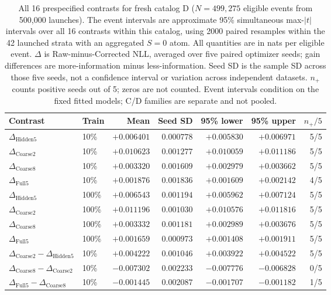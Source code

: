 \begin{table}[!htbp]
\centering
\small
\setlength{\tabcolsep}{3pt}
\caption{All 16 prespecified contrasts for fresh catalog D ($N=499,275$ eligible events from 500,000 launches). The event intervals are approximate 95\% simultaneous max-$|t|$ intervals over all 16 contrasts within this catalog, using 2000 paired resamples within the 42 launched strata with an aggregated $S=0$ atom. All quantities are in nats per eligible event. $\Delta$ is Raw-minus-Corrected NLL, averaged over five paired optimizer seeds; gain differences are more-information minus less-information. Seed SD is the sample SD across those five seeds, not a confidence interval or variation across independent datasets. $n_+$ counts positive seeds out of 5; zeros are not counted. Event intervals condition on the fixed fitted models; C/D families are separate and not pooled.}
\label{tab:information-D-primary16}
\begin{tabular}{llrrrrr}
\toprule
Contrast & Train & Mean & Seed SD & 95\% lower & 95\% upper & $n_+/5$ \\
\midrule
$\Delta_{\mathrm{Hidden5}}$ & 10\% & $+0.006401$ & $0.000778$ & $+0.005830$ & $+0.006971$ & 5/5 \\
$\Delta_{\mathrm{Coarse2}}$ & 10\% & $+0.010623$ & $0.001277$ & $+0.010059$ & $+0.011186$ & 5/5 \\
$\Delta_{\mathrm{Coarse8}}$ & 10\% & $+0.003320$ & $0.001609$ & $+0.002979$ & $+0.003662$ & 5/5 \\
$\Delta_{\mathrm{Full5}}$ & 10\% & $+0.001876$ & $0.001836$ & $+0.001609$ & $+0.002142$ & 4/5 \\
\midrule
$\Delta_{\mathrm{Hidden5}}$ & 100\% & $+0.006543$ & $0.001194$ & $+0.005962$ & $+0.007124$ & 5/5 \\
$\Delta_{\mathrm{Coarse2}}$ & 100\% & $+0.011196$ & $0.001030$ & $+0.010576$ & $+0.011816$ & 5/5 \\
$\Delta_{\mathrm{Coarse8}}$ & 100\% & $+0.003332$ & $0.001181$ & $+0.002989$ & $+0.003676$ & 5/5 \\
$\Delta_{\mathrm{Full5}}$ & 100\% & $+0.001659$ & $0.000973$ & $+0.001408$ & $+0.001911$ & 5/5 \\
\midrule
$\Delta_{\mathrm{Coarse2}}-\Delta_{\mathrm{Hidden5}}$ & 10\% & $+0.004222$ & $0.001046$ & $+0.003922$ & $+0.004522$ & 5/5 \\
$\Delta_{\mathrm{Coarse8}}-\Delta_{\mathrm{Coarse2}}$ & 10\% & $-0.007302$ & $0.002233$ & $-0.007776$ & $-0.006828$ & 0/5 \\
$\Delta_{\mathrm{Full5}}-\Delta_{\mathrm{Coarse8}}$ & 10\% & $-0.001445$ & $0.002087$ & $-0.001707$ & $-0.001182$ & 1/5 \\

\end{tabular}
\end{table}
